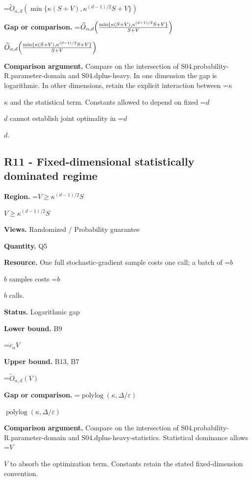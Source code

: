 \documentclass[10pt,a4paper]{article}
\newcommand{\AtlasMath}[1]{\par\begingroup\centering\setbox0=\hbox{$\displaystyle #1$}\ifdim\wd0>1.4\linewidth\typeout{ATLAS WIDE FORMULA: \the\wd0}\fi\ifdim\wd0>\linewidth\resizebox{\linewidth}{!}{\box0}\else\box0\fi\par\endgroup}
\newcommand{\AtlasInlineMath}[1]{\begingroup\setbox0=\hbox{$#1$}\ifdim\wd0>.4\linewidth\endgroup\AtlasMath{#1}\else\endgroup$#1$\fi}
\begin{document}
\AtlasMath{\widetilde{O}_{\alpha,d}(\min\{\kappa(S+V),\kappa^{(d-1)/2}S+V\})}


\textbf{Gap or comparison.} \AtlasInlineMath{\widetilde{O}_{\alpha,d}\!\left({\min\{\kappa(S+V),\kappa^{(d-1)/2}S+V\}\over S+V}\right)}



\textbf{Comparison argument.} Compare on the intersection of S04.probability-R.parameter-domain and S04.dplus-heavy. In one dimension the gap is logarithmic. In other dimensions, retain the explicit interaction between \AtlasInlineMath{\kappa} and the statistical term. Constants allowed to depend on fixed \AtlasInlineMath{d} cannot establish joint optimality in \AtlasInlineMath{d}.



\subsection{R11 - Fixed-dimensional statistically dominated regime}


\textbf{Region.} \AtlasInlineMath{V\ge \kappa^{(d-1)/2}S}



\textbf{Views.} Randomized / Probability guarantee



\textbf{Quantity.} Q5



\textbf{Resource.} One full stochastic-gradient sample costs one call; a batch of \AtlasInlineMath{b} samples costs \AtlasInlineMath{b} calls.



\textbf{Status.} Logarithmic gap



\textbf{Lower bound.} B9



\AtlasMath{c_\alpha V}


\textbf{Upper bound.} B13, B7



\AtlasMath{\widetilde{O}_{\alpha,d}(V)}


\textbf{Gap or comparison.} \AtlasInlineMath{\operatorname{polylog}(\kappa,\Delta/\varepsilon)}



\textbf{Comparison argument.} Compare on the intersection of S04.probability-R.parameter-domain and S04.dplus-heavy-statistics. Statistical dominance allows \AtlasInlineMath{V} to absorb the optimization term. Constants retain the stated fixed-dimension convention.
\end{document}
